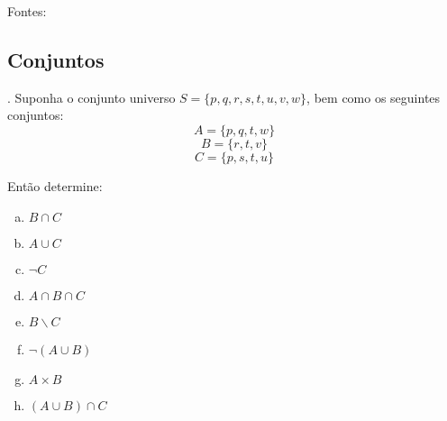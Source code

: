 

\def\tupla#1{\langle #1\rangle}

Fontes: \cite{set:ed2010,set:blauth2010,set:edgard2008}

\subsection{Conjuntos}
\setcounter{exc}{0}

\exercise{}. Suponha o conjunto universo $S=\{p,q,r,s,t,u,v,w\}$,
bem como os seguintes conjuntos:
$$A=\{p,q,t,w\}$$
$$ B = \{r,t,v\}$$ 
$$C=\{p,s,t,u\}$$

Então determine:
\begin{enumerate}[(a)]
\item $B\cap C$
\item $A\cup C$
\item $\neg C$
\item $A \cap B \cap C$
\item $B \backslash C$
\item $\neg (A\cup B)$
\item $A \times B$
\item $(A\cup B)\cap C$
\end{enumerate}





